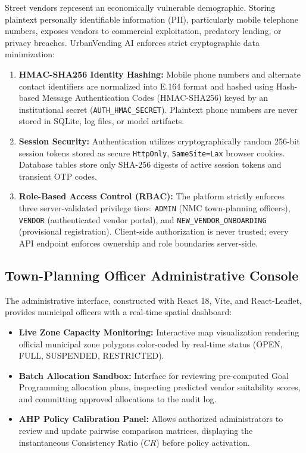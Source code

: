 Street vendors represent an economically vulnerable demographic. Storing plaintext personally identifiable information (PII), particularly mobile telephone numbers, exposes vendors to commercial exploitation, predatory lending, or privacy breaches. UrbanVending AI enforces strict cryptographic data minimization:
\begin{enumerate}
    \item \textbf{HMAC-SHA256 Identity Hashing:} Mobile phone numbers and alternate contact identifiers are normalized into E.164 format and hashed using Hash-based Message Authentication Codes (HMAC-SHA256) keyed by an institutional secret (\texttt{AUTH\_HMAC\_SECRET}). Plaintext phone numbers are never stored in SQLite, log files, or model artifacts.
    \item \textbf{Session Security:} Authentication utilizes cryptographically random 256-bit session tokens stored as secure \texttt{HttpOnly}, \texttt{SameSite=Lax} browser cookies. Database tables store only SHA-256 digests of active session tokens and transient OTP codes.
    \item \textbf{Role-Based Access Control (RBAC):} The platform strictly enforces three server-validated privilege tiers: \texttt{ADMIN} (NMC town-planning officers), \texttt{VENDOR} (authenticated vendor portal), and \texttt{NEW\_VENDOR\_ONBOARDING} (provisional registration). Client-side authorization is never trusted; every API endpoint enforces ownership and role boundaries server-side.
\end{enumerate}

\subsection{Town-Planning Officer Administrative Console}
\label{sec:impl_admin_ui}

The administrative interface, constructed with React 18, Vite, and React-Leaflet, provides municipal officers with a real-time spatial dashboard:
\begin{itemize}
    \item \textbf{Live Zone Capacity Monitoring:} Interactive map visualization rendering official municipal zone polygons color-coded by real-time status (OPEN, FULL, SUSPENDED, RESTRICTED).
    \item \textbf{Batch Allocation Sandbox:} Interface for reviewing pre-computed Goal Programming allocation plans, inspecting predicted vendor suitability scores, and committing approved allocations to the audit log.
    \item \textbf{AHP Policy Calibration Panel:} Allows authorized administrators to review and update pairwise comparison matrices, displaying the instantaneous Consistency Ratio ($CR$) before policy activation.
\end{itemize}

